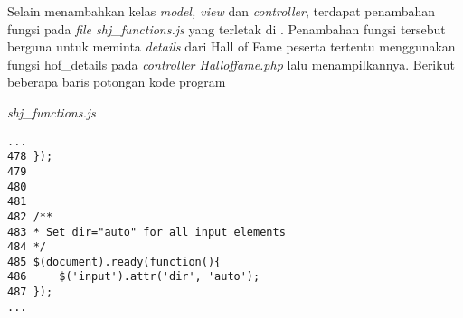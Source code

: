 Selain menambahkan kelas \textit{model, view} dan \textit{controller}, terdapat penambahan fungsi pada \textit{file shj\_functions.js} yang terletak di . Penambahan fungsi tersebut berguna untuk meminta \textit{details} dari Hall of Fame peserta tertentu menggunakan fungsi hof\_details pada \textit{controller Halloffame.php} lalu menampilkannya.
Berikut beberapa baris potongan kode program

\textit{shj\_functions.js}
\begin{lstlisting}[basicstyle=\ttfamily, frame=single,
columns=fullflexible, keepspaces=true, breaklines=true]
...
478	});
479
480
481
482	/**
483	* Set dir="auto" for all input elements
484	*/
485	$(document).ready(function(){
486		$('input').attr('dir', 'auto');
487	});
...
\end{lstlisting}

